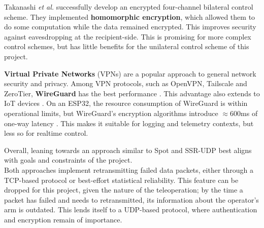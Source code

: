 Takanashi \textit{et al.} \cite{bib:networks_four_channel} successfully develop an encrypted four-channel bilateral control scheme. They implemented \textbf{homomorphic encryption}, which allowed them to do some computation while the data remained encrypted. This improves security against eavesdropping at the recipient-side. This is promising for more complex control schemes, but has little benefits for the unilateral control scheme of this project.

\textbf{Virtual Private Networks} (VPNs) are a popular approach to general network security and privacy. Among VPN protocols, such as OpenVPN, Tailscale and ZeroTier, \textbf{WireGuard} has the best performance \cite{bib:networks_compare_VPN}. This advantage also extends to IoT devices \cite{bib:networks_compare_VPN_for_IoT}. On an ESP32, the resource consumption of WireGuard is within operational limits, but WireGuard's encryption algorithms introduce $\approx600$ms of one-way latency \cite{bib:networks_WireGuard_ESP32}. This makes it suitable for logging and telemetry contexts, but less so for realtime control.

Overall, leaning towards an approach similar to Spot and SSR-UDP best aligns with goals and constraints of the project.\\
Both approaches implement retransmitting failed data packets, either through a TCP-based protocol or best-effort statistical reliability. This feature can be dropped for this project, given the nature of the teleoperation; by the time a packet has failed and needs to retransmitted, its information about the operator's arm is outdated. This lends itself to a UDP-based protocol, where authentication and encryption remain of importance.


